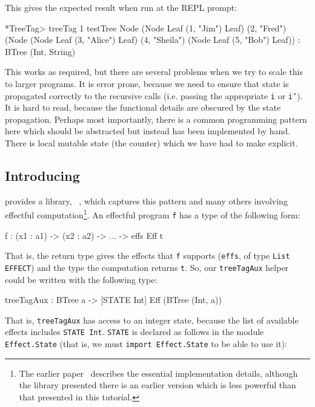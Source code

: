 \noindent
This gives the expected result when run at the \Idris{} REPL prompt:

\begin{code}
*TreeTag> treeTag 1 testTree
Node (Node Leaf (1, "Jim") Leaf)
     (2, "Fred")
     (Node (Node Leaf (3, "Alice") Leaf)
           (4, "Sheila")
           (Node Leaf (5, "Bob") Leaf)) : BTree (Int, String)
\end{code}

\noindent
This works as required, but there are several problems when we try to scale
this to larger programs. It is error prone, because we need to ensure that
state is propagated correctly to the recursive calls (i.e. passing the
appropriate \texttt{i} or \texttt{i'}). It is hard to read, because the
functional details are obscured by the state propagation. Perhaps most
importantly, there is a common programming pattern here which should be
abstracted but instead has been implemented by hand. There is local mutable
state (the counter) which we have had to make explicit.

\subsection{Introducing \effects{}}

\Idris{} provides a library, \effects{}~\cite{brady-icfp2013}, which captures
this pattern and many others involving effectful computation\footnote{The
earlier paper~\cite{brady-icfp2013} describes the essential implementation
details, although the library presented there is an earlier version which is
less powerful than that presented in this tutorial.}. An effectful program
\texttt{f} has a type of the following form:

\begin{code}
f : (x1 : a1) -> (x2 : a2) -> ... -> { effs } Eff t
\end{code}

\noindent
That is, the return type gives the effects that \texttt{f} supports
(\texttt{effs}, of type \texttt{List EFFECT}) and the
type the computation returns \texttt{t}.
So, our
\texttt{treeTagAux} helper could be written with the following type:

\begin{code}
treeTagAux : BTree a -> { [STATE Int] } Eff (BTree (Int, a))
\end{code}

\noindent
That is, \texttt{treeTagAux} has access to an integer state, because the
list of available effects includes \texttt{STATE Int}. \texttt{STATE} is
declared as follows in the module \texttt{Effect.State} (that is, we must
\texttt{import Effect.State} to be able to use it):

